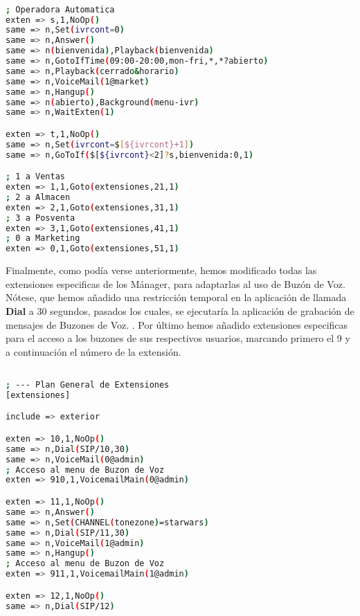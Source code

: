 
\begin{lstlisting}[language=bash,title={/etc/asterisk/extensions.conf}]

; Operadora Automatica
exten => s,1,NoOp()
same => n,Set(ivrcont=0)
same => n,Answer()
same => n(bienvenida),Playback(bienvenida)
same => n,GotoIfTime(09:00-20:00,mon-fri,*,*?abierto)
same => n,Playback(cerrado&horario)
same => n,VoiceMail(1@market)
same => n,Hangup()
same => n(abierto),Background(menu-ivr)
same => n,WaitExten(1)

exten => t,1,NoOp()
same => n,Set(ivrcont=$[${ivrcont}+1])
same => n,GoToIf($[${ivrcont}<2]?s,bienvenida:0,1)

; 1 a Ventas
exten => 1,1,Goto(extensiones,21,1)
; 2 a Almacen 
exten => 2,1,Goto(extensiones,31,1)
; 3 a Posventa
exten => 3,1,Goto(extensiones,41,1)
; 0 a Marketing
exten => 0,1,Goto(extensiones,51,1)

\end{lstlisting}

Finalmente, como podía verse anteriormente, hemos modificado todas las extensiones especificas de los Mánager, para adaptarlas al uso de Buzón de Voz. Nótese, que hemos añadido una restricción temporal en la aplicación de llamada \textbf{Dial} a 30 segundos, pasados los cuales, se ejecutaría la aplicación de grabación de mensajes de Buzones de Voz. . Por último hemos añadido extensiones especificas para el acceso a los buzones de sus respectivos usuarios, marcando primero el 9 y a continuación el número de la extensión.

\begin{lstlisting}[language=bash,title={/etc/asterisk/extensions.conf}]

; --- Plan General de Extensiones
[extensiones]

include => exterior

exten => 10,1,NoOp()
same => n,Dial(SIP/10,30)
same => n,VoiceMail(0@admin)
; Acceso al menu de Buzon de Voz
exten => 910,1,VoicemailMain(0@admin)

exten => 11,1,NoOp()
same => n,Answer()
same => n,Set(CHANNEL(tonezone)=starwars)
same => n,Dial(SIP/11,30)
same => n,VoiceMail(1@admin)
same => n,Hangup()
; Acceso al menu de Buzon de Voz
exten => 911,1,VoicemailMain(1@admin)

exten => 12,1,NoOp()
same => n,Dial(SIP/12)

\end{lstlisting}

